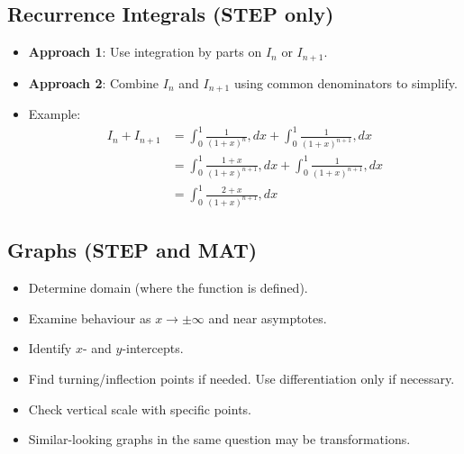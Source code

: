 \documentclass[11pt]{article}
\begin{document}
\subsection{Recurrence Integrals (STEP only)}
\begin{itemize}
\item \textbf{Approach 1}: Use integration by parts on $I_n$ or $I_{n+1}$.
\item \textbf{Approach 2}: Combine $I_n$ and $I_{n+1}$ using common denominators to simplify.
\item Example:
\begin{align*}
I_n + I_{n+1} &= \int_0^1 \frac{1}{(1+x)^n} , dx + \int_0^1 \frac{1}{(1+x)^{n+1}} , dx \\
&= \int_0^1 \frac{1+x}{(1+x)^{n+1}} , dx + \int_0^1 \frac{1}{(1+x)^{n+1}} , dx \\
&= \int_0^1 \frac{2+x}{(1+x)^{n+1}} , dx
\end{align*}
\end{itemize}

\subsection{Graphs (STEP and MAT)}
\begin{itemize}
\item Determine domain (where the function is defined).
\item Examine behaviour as $x \to \pm\infty$ and near asymptotes.
\item Identify $x$- and $y$-intercepts.
\item Find turning/inflection points if needed. Use differentiation only if necessary.
\item Check vertical scale with specific points.
\item Similar-looking graphs in the same question may be transformations.
\end{itemize}
\end{document}
